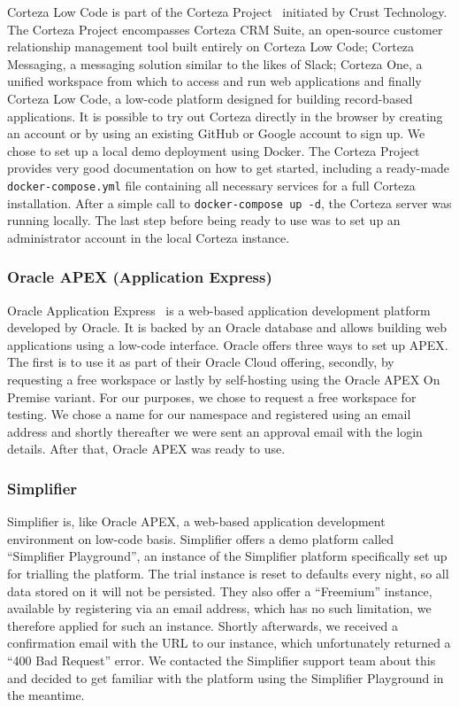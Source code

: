 \documentclass[runningheads]{llncs}
\begin{document}
Corteza Low Code is part of the Corteza Project~\cite{corteza} initiated by Crust Technology. The Corteza Project encompasses Corteza CRM Suite, an open-source customer relationship management tool built entirely on Corteza Low Code; Corteza Messaging, a messaging solution similar to the likes of Slack; Corteza One, a unified workspace from which to access and run web applications and finally Corteza Low Code, a low-code platform designed for building record-based applications. It is possible to try out Corteza directly in the browser by creating an account or by using an existing GitHub or Google account to sign up. We chose to set up a local demo deployment using Docker. The Corteza Project provides very good documentation on how to get started, including a ready-made \texttt{docker-compose.yml} file containing all necessary services for a full Corteza installation. After a simple call to \texttt{docker-compose up -d}, the Corteza server was running locally. The last step before being ready to use was to set up an administrator account in the local Corteza instance.

\subsubsection{Oracle APEX (Application Express)}

Oracle Application Express~\cite{oracle_apex} is a web-based application development platform developed by Oracle. It is backed by an Oracle database and allows building web applications using a low-code interface. Oracle offers three ways to set up APEX. The first is to use it as part of their Oracle Cloud offering, secondly, by requesting a free workspace or lastly by self-hosting using the Oracle APEX On Premise variant. For our purposes, we chose to request a free workspace for testing. We chose a name for our namespace and registered using an email address and shortly thereafter we were sent an approval email with the login details. After that, Oracle APEX was ready to use.

\subsubsection{Simplifier}

Simplifier is, like Oracle APEX, a web-based application development environment on low-code basis. Simplifier offers a demo platform called “Simplifier Playground”, an instance of the Simplifier platform specifically set up for trialling the platform. The trial instance is reset to defaults every night, so all data stored on it will not be persisted. They also offer a “Freemium” instance, available by registering via an email address, which has no such limitation, we therefore applied for such an instance. Shortly afterwards, we received a confirmation email with the URL to our instance, which unfortunately returned a “400 Bad Request” error. We contacted the Simplifier support team about this and decided to get familiar with the platform using the Simplifier Playground in the meantime.
\end{document}
